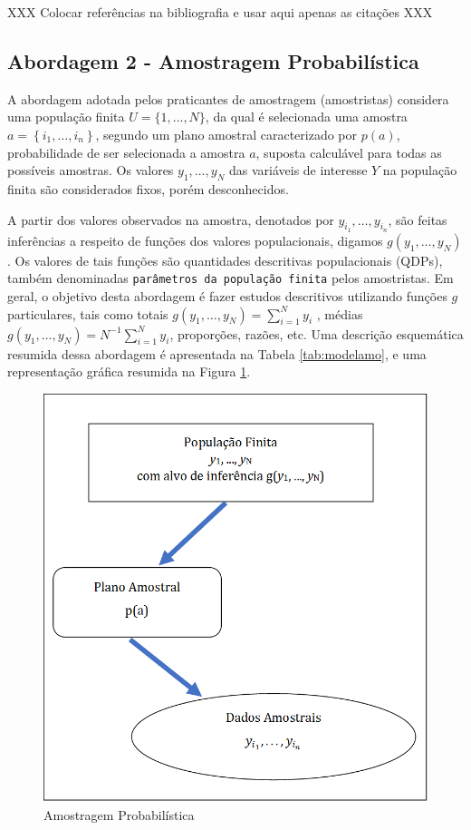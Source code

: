 \documentclass[]{book}
\theoremstyle{definition}
\theoremstyle{definition}
\theoremstyle{definition}
\theoremstyle{remark}
\begin{document}
XXX Colocar referências na bibliografia e usar aqui apenas as citações
XXX

\subsection{Abordagem 2 - Amostragem
Probabilística}\label{abordagem-2---amostragem-probabilistica}

A abordagem adotada pelos praticantes de amostragem (amostristas)
considera uma população finita \(U=\{1,\ldots ,N\}\), da qual é
selecionada uma amostra \(a=\left\{ i_{1},\ldots ,i_{n}\right\}\),
segundo um plano amostral caracterizado por \(p\left( a\right)\),
probabilidade de ser selecionada a amostra \(a\), suposta calculável
para todas as possíveis amostras. Os valores \(y_{1},\ldots ,y_{N}\) das
variáveis de interesse \(Y\) na população finita são considerados fixos,
porém desconhecidos. \textbar{}

A partir dos valores observados na amostra, denotados por
\(y_{i_{1}}, \ldots, y_{i_{n}}\), são feitas inferências a respeito de
funções dos valores populacionais, digamos
\(g\left( y_{1}, \ldots , y_{N}\right)\). Os valores de tais funções são
quantidades descritivas populacionais (QDPs), também denominadas
\texttt{parâmetros\ da\ população\ finita} pelos amostristas. Em geral,
o objetivo desta abordagem é fazer estudos descritivos utilizando
funções \(g\) particulares, tais como totais
\(g\left( y_{1}, \ldots , y_{N}\right) = \sum_{i=1}^{N} y_{i}\) , médias
\(g\left( y_{1}, \ldots , y_{N}\right) = N^{-1}\sum_{i=1}^{N} y_{i}\),
proporções, razões, etc. Uma descrição esquemática resumida dessa
abordagem é apresentada na Tabela \ref{tab:modelamo}, e uma
representação gráfica resumida na Figura \ref{fig:modamo}.

\begin{figure}
\centering
\includegraphics{Figuras/Figura2.2.png}
\caption{\label{fig:modamo}Amostragem Probabilística}
\end{figure}
\end{document}
